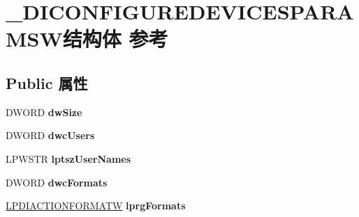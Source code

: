\hypertarget{struct___d_i_c_o_n_f_i_g_u_r_e_d_e_v_i_c_e_s_p_a_r_a_m_s_w}{}\section{\+\_\+\+D\+I\+C\+O\+N\+F\+I\+G\+U\+R\+E\+D\+E\+V\+I\+C\+E\+S\+P\+A\+R\+A\+M\+S\+W结构体 参考}
\label{struct___d_i_c_o_n_f_i_g_u_r_e_d_e_v_i_c_e_s_p_a_r_a_m_s_w}
\subsection*{Public 属性}
\begin{DoxyCompactItemize}
\item 
\mbox{\label{struct___d_i_c_o_n_f_i_g_u_r_e_d_e_v_i_c_e_s_p_a_r_a_m_s_w_a484eef6fe396a03a7fdb8062cb72b1b0}} 
D\+W\+O\+RD {\bfseries dw\+Size}
\item 
\mbox{\label{struct___d_i_c_o_n_f_i_g_u_r_e_d_e_v_i_c_e_s_p_a_r_a_m_s_w_a7a0ad50176cf4a7d25f83c019a9dc03a}} 
D\+W\+O\+RD {\bfseries dwc\+Users}
\item 
\mbox{\label{struct___d_i_c_o_n_f_i_g_u_r_e_d_e_v_i_c_e_s_p_a_r_a_m_s_w_a8b141400e4d7bc3d65551ce350df1e5d}} 
L\+P\+W\+S\+TR {\bfseries lptsz\+User\+Names}
\item 
\mbox{\label{struct___d_i_c_o_n_f_i_g_u_r_e_d_e_v_i_c_e_s_p_a_r_a_m_s_w_a0aaa097ec77af3df6092f53c1ac03929}} 
D\+W\+O\+RD {\bfseries dwc\+Formats}
\item 
\mbox{\label{struct___d_i_c_o_n_f_i_g_u_r_e_d_e_v_i_c_e_s_p_a_r_a_m_s_w_a24c975f010a586af1bd13cd82c162e69}} 
\hyperlink{struct___d_i_a_c_t_i_o_n_f_o_r_m_a_t_w}{L\+P\+D\+I\+A\+C\+T\+I\+O\+N\+F\+O\+R\+M\+A\+TW} {\bfseries lprg\+Formats}
\item 
\mbox{\label{struct___d_i_c_o_n_f_i_g_u_r_e_d_e_v_i_c_e_s_p_a_r_a_m_s_w_a69322ba84dc3f7f004f4c0d732911654}} 

\end{DoxyCompactItemize}
